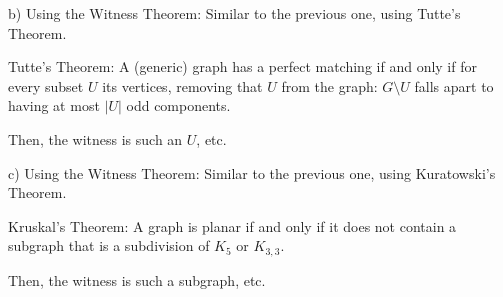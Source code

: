 b) Using the Witness Theorem: Similar to the previous one, using Tutte's Theorem.

Tutte's Theorem: A (generic) graph has a perfect matching if and only if for every subset $U$ its vertices, removing that $U$ from the graph: $G \setminus{} U$ falls apart to having at most $|U|$ odd components.

Then, the witness is such an $U$, etc.

c) Using the Witness Theorem: Similar to the previous one, using Kuratowski's Theorem.

Kruskal's Theorem: A graph is planar if and only if it does not contain a subgraph that is a subdivision of $K_5$ or $K_{3,3}$.

Then, the witness is such a subgraph, etc.